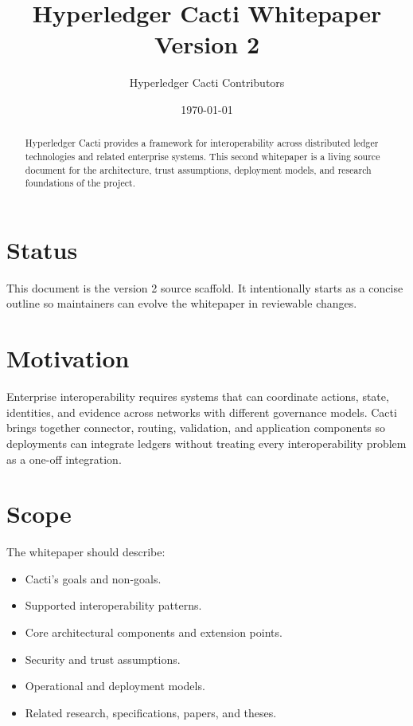 \documentclass[11pt,letterpaper]{article}
\title{Hyperledger Cacti Whitepaper\\Version 2}
\author{Hyperledger Cacti Contributors}
\date{\today}
\begin{document}
\maketitle

\begin{abstract}
Hyperledger Cacti provides a framework for interoperability across distributed
ledger technologies and related enterprise systems. This second whitepaper is a
living source document for the architecture, trust assumptions, deployment
models, and research foundations of the project.
\end{abstract}

\tableofcontents
\newpage

\section{Status}

This document is the version 2 source scaffold. It intentionally starts as a
concise outline so maintainers can evolve the whitepaper in reviewable changes.

\section{Motivation}

Enterprise interoperability requires systems that can coordinate actions,
state, identities, and evidence across networks with different governance
models. Cacti brings together connector, routing, validation, and application
components so deployments can integrate ledgers without treating every
interoperability problem as a one-off integration.

\section{Scope}

The whitepaper should describe:

\begin{itemize}
  \item Cacti's goals and non-goals.
  \item Supported interoperability patterns.
  \item Core architectural components and extension points.
  \item Security and trust assumptions.
  \item Operational and deployment models.
  \item Related research, specifications, papers, and theses.
\end{itemize}
\end{document}
